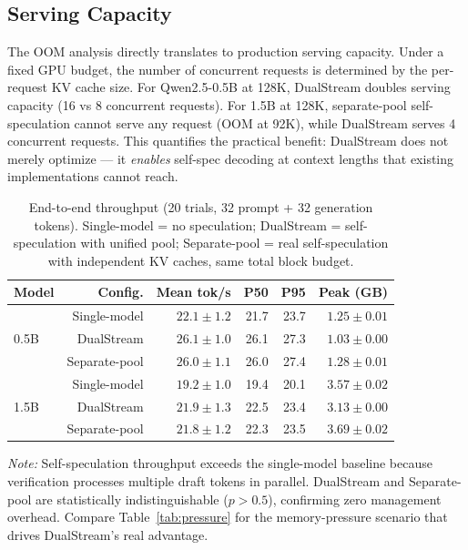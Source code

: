 \documentclass[review]{elsarticle}
\theoremstyle{definition}
\theoremstyle{remark}
\begin{document}
\subsection{Serving Capacity}

The OOM analysis directly translates to production serving capacity.
Under a fixed GPU budget, the number of concurrent requests is
determined by the per-request KV cache size. For Qwen2.5-0.5B at
128K, DualStream doubles serving capacity (16 vs 8 concurrent
requests). For 1.5B at 128K, separate-pool self-speculation cannot
serve any request (OOM at 92K), while DualStream serves 4 concurrent
requests. This quantifies the practical benefit: DualStream does not
merely optimize --- it \emph{enables} self-spec decoding at context
lengths that existing implementations cannot reach.

\begin{table}[t]
\centering
\caption{End-to-end throughput (20 trials, 32 prompt + 32 generation tokens).
Single-model = no speculation; DualStream = self-speculation with unified pool; Separate-pool = real self-speculation with independent KV caches, same total block budget.}
\label{tab:throughput}
\begin{tabular}{lrrrrr}
\toprule
Model & Config. & Mean tok/s & P50 & P95 & Peak (GB) \\
\midrule
\multirow{3}{*}{0.5B}
  & Single-model & $22.1 \pm 1.2$ & 21.7 & 23.7 & $1.25 \pm 0.01$ \\
  & DualStream & $26.1 \pm 1.0$ & 26.1 & 27.3 & $1.03 \pm 0.00$ \\
  & Separate-pool & $26.0 \pm 1.1$ & 26.0 & 27.4 & $1.28 \pm 0.01$ \\
\midrule
\multirow{3}{*}{1.5B}
  & Single-model & $19.2 \pm 1.0$ & 19.4 & 20.1 & $3.57 \pm 0.02$ \\
  & DualStream & $21.9 \pm 1.3$ & 22.5 & 23.4 & $3.13 \pm 0.00$ \\
  & Separate-pool & $21.8 \pm 1.2$ & 22.3 & 23.5 & $3.69 \pm 0.02$ \\
\bottomrule
\end{tabular}
\end{table}

\vspace{-0.5em}
\noindent\textit{Note:} Self-speculation throughput exceeds the single-model baseline because verification processes multiple draft tokens in parallel. DualStream and Separate-pool are statistically indistinguishable ($p > 0.5$), confirming zero management overhead. Compare Table~\ref{tab:pressure} for the memory-pressure scenario that drives DualStream's real advantage.
\end{document}
